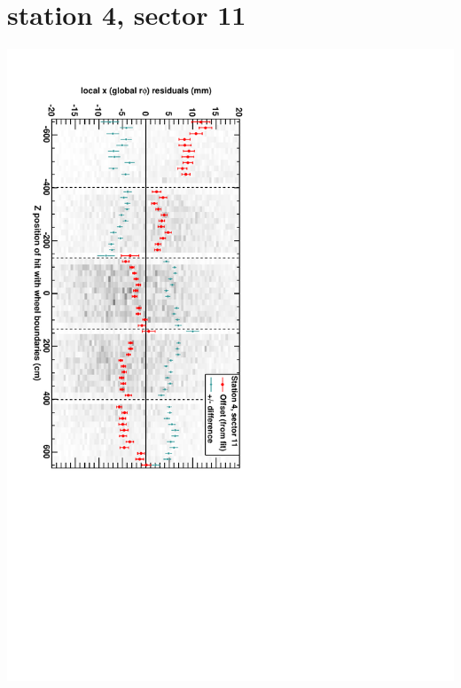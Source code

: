 \documentclass[compress]{beamer}
\begin{document}
\section*{station 4, sector 11}
\begin{frame} \vfill \mbox{\hspace{-1 cm}\includegraphics[height=1.2\linewidth, angle=90]{DTrphiVsZ_st4_sr11.pdf}} \end{frame}
\end{document}
